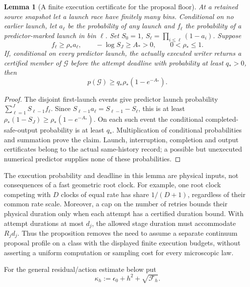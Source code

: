 \documentclass[11pt]{article}
\numberwithin{equation}{section}
\newtheorem{lemma}[lemma]{Lemma}
\theoremstyle{definition}
\theoremstyle{remark}
\begin{document}
\begin{lemma}[A finite execution certificate for the proposal floor]
\label{lem:supp-executed-proposal-floor}
At a retained source snapshot let a launch race have finitely many bins.
Conditional on no earlier launch, let $a_\ell$ be the probability of any
launch and $f_\ell$ the probability of a predictor-marked launch in bin
$\ell$.  Set $S_0=1$, $S_\ell=\prod_{i\le\ell}(1-a_i)$.
Suppose
\begin{equation}
 f_\ell\ge\rho_*a_\ell,\qquad
 -\log S_J\ge A_*>0,\qquad 0<\rho_*\le1.
 \label{eq:supp-launch-share}
\end{equation}
If, conditional on every predictor launch, the actually executed writer
returns a certified member of $\mathcal G$ before the attempt deadline with
probability at least $q_*>0$, then
\begin{equation}
 p(\mathcal G)\ge q_*\rho_*(1-e^{-A_*}).
 \label{eq:supp-executed-proposal-floor}
\end{equation}
\end{lemma}
\begin{proof}
The disjoint first-launch events give predictor launch probability
$\sum_{\ell=1}^J S_{\ell-1}f_\ell$.  Since
$S_{\ell-1}a_\ell=S_{\ell-1}-S_\ell$, this is at least
$\rho_*(1-S_J)\ge\rho_*(1-e^{-A_*})$.  On each such event the conditional
completed-safe-output probability is at least $q_*$.  Multiplication of
conditional probabilities and summation prove the claim.  Launch,
interruption, completion and output certificates belong to the actual
same-history record; a possible but unexecuted numerical predictor supplies
none of these probabilities.
\end{proof}

The execution probability and deadline in this lemma are physical inputs,
not consequences of a fast geometric root clock.  For example, one root clock
competing with $D$ clocks of equal rate has share $1/(D+1)$, regardless of
their common rate scale.  Moreover, a cap on the number of retries bounds their
physical duration only when each attempt has a certified duration bound.  With
attempt durations at most $d_j$, the allowed stage duration must accommodate
$R_jd_j$.  Thus the proposition removes the need to assume a separate
continuum proposal profile on a class with the displayed finite execution
budgets, without asserting a uniform computation or sampling cost for every
microscopic law.

For the general residual/action estimate below put
\begin{equation}
 \kappa_h:=\epsilon_0+h^2+\sqrt{\mathcal F_h}.
 \label{eq:supp-gowdy-kappa}
\end{equation}
\end{document}
